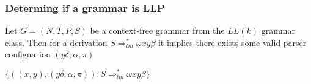 \subsubsection{Determing if a grammar is LLP}
Let $G = (N, T, P, S)$ be a context-free grammar from the $LL(k)$ grammar class. Then for a derivation $S \Rightarrow^*_{lm} \omega x y \beta$ it implies there exists some valid parser configuarion $(y\delta, \alpha, \pi)$

$\{((x, y), (y\delta,\alpha, \pi)) : S \Rightarrow^*_{lm} \omega x y \beta \}$
